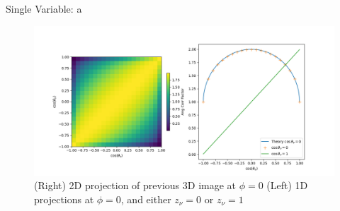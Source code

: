 \documentclass{beamer}
\begin{document}
\begin{frame}{Single Variable: a}
	\begin{figure}
		\centering
		\includegraphics[width=0.8\paperwidth]{plots/crosssections_a.png}
		\caption{(Right) 2D projection of previous 3D image at $\phi = 0$ (Left) 1D projections at $\phi=0$, and either $z_\nu = 0$ or $z_\nu = 1$ }
	\end{figure}
\end{frame}
\end{document}
